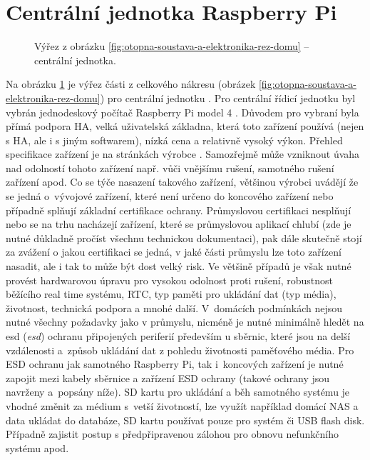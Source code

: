 \section{Centrální jednotka Raspberry Pi}


\begin{figure}[H]
    \centering
    \def\svgwidth{0.3\columnwidth}
    
    \caption[Výřez pro centrální jednotku.]{Výřez z obrázku \ref{fig:otopna-soustava-a-elektronika-rez-domu} – centrální jednotka.}
    \label{fig:vyrez-centralni-jednotka}
\end{figure}

Na obrázku \ref{fig:vyrez-centralni-jednotka} je výřez části z celkového nákresu (obrázek \ref{fig:otopna-soustava-a-elektronika-rez-domu}) pro centrální jednotku . Pro centrální řídicí jednotku byl vybrán jednodeskový počítač Raspberry Pi model 4 \cite{raspberry-pi}. Důvodem pro vybraní byla přímá podpora HA, velká uživatelská základna, která toto zařízení používá (nejen s HA, ale i s jiným softwarem), nízká cena a relativně vysoký výkon. Přehled specifikace zařízení je na stránkách výrobce \cite{raspberry-pi}. Samozřejmě může vzniknout úvaha nad odolností tohoto zařízení např. vůči vnějšímu rušení, samotného rušení zařízení apod. Co se týče nasazení takového zařízení, většinou výrobci uvádějí že se jedná o~vývojové zařízení, které není určeno do koncového zařízení nebo případně splňují  základní certifikace ochrany. Průmyslovou certifikaci nesplňují nebo se na trhu nacházejí zařízení, které se průmyslovou aplikací chlubí (zde je nutné důkladně pročíst všechnu technickou dokumentaci), pak dále skutečně stojí za zvážení o jakou certifikaci se jedná, v jaké části průmyslu lze toto zařízení nasadit, ale i tak to může být dost velký risk. Ve většině případů je však nutné provést hardwarovou úpravu pro vysokou odolnost proti rušení, robustnost běžícího real time systému, RTC, typ paměti pro ukládání dat (typ média), životnost, technická podpora a mnohé další. V~domácích podmínkách nejsou nutné všechny požadavky jako v průmyslu, nicméně je nutné minimálně hledět na \acrshort{esd} (\textit{\acrlong{esd}}) ochranu připojených periferií především u sběrnic, které jsou na delší vzdálenosti a~způsob ukládání dat z pohledu životnosti paměťového média. Pro ESD ochranu jak samotného Raspberry Pi, tak i~koncových zařízení je nutné zapojit mezi kabely sběrnice a zařízení ESD ochrany (takové ochrany jsou navrženy a~popsány níže). SD kartu pro ukládání a běh samotného systému je vhodné změnit za médium s~vetší životností, lze využít například domácí NAS a data ukládat do databáze, SD kartu používat pouze pro systém či USB flash disk. Případně zajistit postup s předpřipravenou zálohou pro obnovu nefunkčního systému apod. 